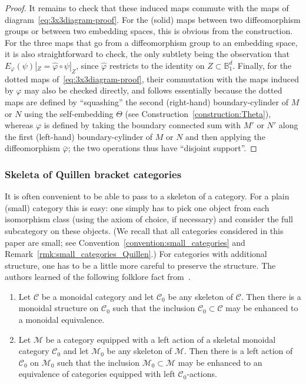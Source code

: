 \documentclass[AHL,Unicode,published]{cedram}
\newcommand{\cC}{\mathcal{C}}
\newcommand{\cM}{\mathcal{M}}
\newcommand{\bB}{\mathbb{B}}
\newcommand*{\bromanenumi}{\renewcommand*{\theenumi}{\textbf{\roman{enumi}}}}
\begin{document}
\begin{proof}
It remains to check that these induced maps commute with the maps of diagram~\eqref{eq:3x3diagram-proof}. For the (solid) maps between two diffeomorphism groups or between two embedding spaces, this is obvious from the construction. For the three maps that go from a diffeomorphism group to an embedding space, it is also straightforward to check, the only subtlety being the observation that $E_\varphi(\psi)|_Z = \widehat{\varphi} \circ \psi|_Z$, since $\widehat{\varphi}$ restricts to the identity on $Z \subset \bB^d_{1}$. Finally, for the dotted maps of~\eqref{eq:3x3diagram-proof}, their commutation with the maps induced by $\varphi$ may also be checked directly, and follows essentially because the dotted maps are defined by ``squashing'' the second (right-hand) boundary-cylinder of $M$ or $N$ using the self-embedding $\Theta$ (see Construction~\ref{construction:Theta}), whereas $\varphi$ is defined by taking the boundary connected sum with $M'$ or $N'$ along the first (left-hand) boundary-cylinder of $M$ or $N$ and then applying the diffeomorphism $\bar{\varphi}$; the two operations thus have ``disjoint support''.
\end{proof}


\subsubsection{Skeleta of Quillen bracket categories}\label{sss:skeleta}

It is often convenient to be able to pass to a skeleton of a category. For a plain (small) category this is easy: one simply has to pick one object from each isomorphism class (using the axiom of choice, if necessary) and consider the full subcategory on these objects. (We recall that all categories considered in this paper are small; see Convention~\ref{convention:small_categories} and Remark~\ref{rmk:small_categories_Quillen}.) For categories with additional structure, one has to be a little more careful to preserve the structure. The authors learned of the following folklore fact from~\cite{MO_31599}.

\begin{prop}\label{prop:monoidal-skeleton}\leavevmode
\begin{enumerate}\bromanenumi
\item\label{prop1.82.1} Let $\cC$ be a monoidal category and let $\cC_{0}$ be any skeleton of $\cC$. Then there is a monoidal structure on $\cC_{0}$ such that the inclusion $\cC_{0} \subset \cC$ may be enhanced to a monoidal equivalence.

\item\label{prop1.82.2} Let $\cM$ be a category equipped with a left action of a skeletal monoidal category $\cC_{0}$ and let $\cM_{0}$ be any skeleton of $\cM$. Then there is a left action of $\cC_{0}$ on $\cM_{0}$ such that the inclusion $\cM_{0} \subset \cM$ may be enhanced to an equivalence of categories equipped with left $\cC_{0}$-actions.
\end{enumerate}
\end{prop}
\end{document}
